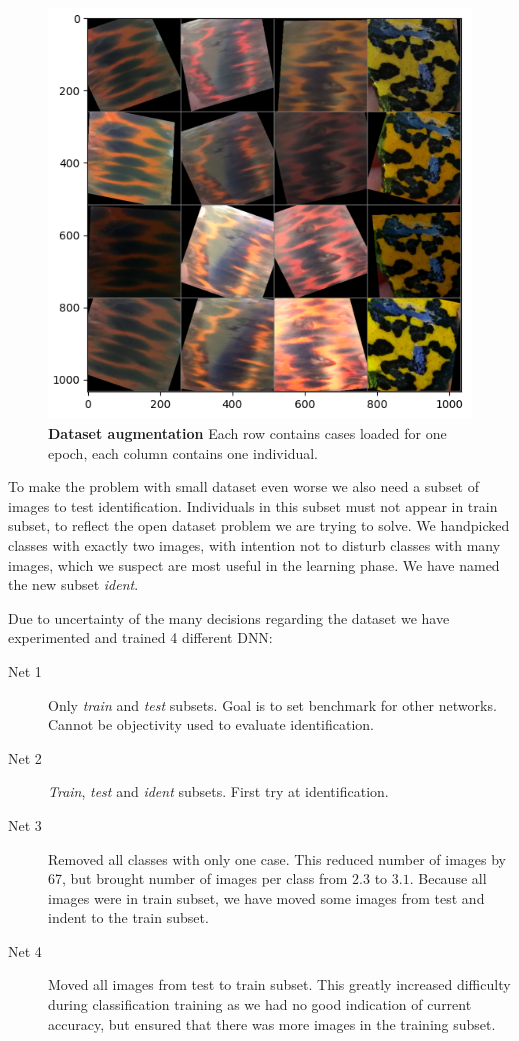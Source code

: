\documentclass[fleqn,moreauthors,10pt]{ds_report}
\begin{document}
\begin{figure}[h]\centering
	\includegraphics[width=0.8\linewidth]{augmentation.png}
	\caption{\textbf{Dataset augmentation} Each row contains cases loaded for one epoch, each column contains one individual.}
	\label{fig:augmentation}
\end{figure}

To make the problem with small dataset even worse we also need a subset of images to test identification. Individuals in this subset must not appear in train subset, to reflect the open dataset problem we are trying to solve. We handpicked classes with exactly two images, with intention not to disturb classes with many images, which we suspect are most useful in the learning phase. We have named the new subset \textit{ident}.

\newpage
Due to uncertainty of the many decisions regarding the dataset we have experimented and trained 4 different DNN:
\begin{description}
	\item[Net 1] Only \textit{train} and \textit{test} subsets. Goal is to set benchmark for other networks. Cannot be objectivity used to evaluate identification.
	\item[Net 2] \textit{Train}, \textit{test} and \textit{ident} subsets. First try at identification. 
	\item[Net 3] Removed all classes with only one case. This reduced number of images by 67, but brought number of images per class from $2.3$ to $3.1$. Because all images were in train subset, we have moved some images from test and indent to the train subset.
	\item[Net 4] Moved all images from test to train subset. This greatly increased difficulty during classification training as we had no good indication of current accuracy, but ensured that there was more images in the training subset.
\end{description}
\end{document}
